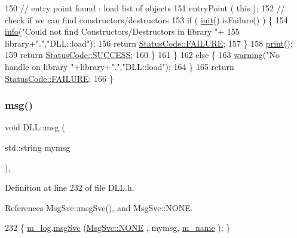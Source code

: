 \begin{DoxyCode}
150       \textcolor{comment}{// entry point found : load list of objects}
151       entryPoint ( \textcolor{keyword}{this} );
152       \textcolor{comment}{// check if we can find constructors/destructors}
153       \textcolor{keywordflow}{if} ( \hyperlink{classDLL_ad2a4ae95995c0fa312ae31169df12d72}{init}().isFailure() ) \{
154     \hyperlink{classDLL_a2b7ea0c85b83a1dec03e4fce13c0d5d2}{info}(\textcolor{stringliteral}{"Could not find Constructors/Destructors in library "}+
155          library+\textcolor{stringliteral}{"."},\textcolor{stringliteral}{"DLL::load"});
156         \textcolor{keywordflow}{return} \hyperlink{classStatusCode_a6f565cbeadc76d14c72f047e5e85eb4ba3da73d4c469762eb9d3c960368252b26}{StatusCode::FAILURE};
157       \}
158       \hyperlink{classDLL_ae45f8b4b291e9da806f4921dd7468cfc}{print}();
159       \textcolor{keywordflow}{return} \hyperlink{classStatusCode_a6f565cbeadc76d14c72f047e5e85eb4badd0da38d3ba0d922efd1f4619bc37ad8}{StatusCode::SUCCESS};
160     \}
161   \}
162   \textcolor{keywordflow}{else} \{
163     \hyperlink{classDLL_a4bbc341bad623eedb5c228c91ce2e858}{warning}(\textcolor{stringliteral}{"No handle on library "}+library+\textcolor{stringliteral}{"."},\textcolor{stringliteral}{"DLL::load"});
164   \}
165   \textcolor{keywordflow}{return} \hyperlink{classStatusCode_a6f565cbeadc76d14c72f047e5e85eb4ba3da73d4c469762eb9d3c960368252b26}{StatusCode::FAILURE};
166 \}
\end{DoxyCode}
\mbox{\label{classDLL_a3a4774ae240e805b9c3ce18b7418d7cc}} 
\subsubsection{\texorpdfstring{msg()}{msg()}\hspace{0.1cm}{\footnotesize\ttfamily [1/2]}}
{\footnotesize\ttfamily void D\+L\+L\+::msg (\begin{DoxyParamCaption}\item[{std\+::string}]{mymsg }\end{DoxyParamCaption})\hspace{0.3cm}{\ttfamily [inline]}, {\ttfamily [private]}}



Definition at line 232 of file D\+L\+L.\+h.



References Msg\+Svc\+::msg\+Svc(), and Msg\+Svc\+::\+N\+O\+NE.


\begin{DoxyCode}
232 \{ \hyperlink{classDLL_a6e66cd993e2d142b48691557ce8e4047}{m\_log}.\hyperlink{classMsgSvc_ad25f18047920cc59a314e5098259711c}{msgSvc} (\hyperlink{classMsgSvc_ae671eb7301996cd049d2da8a65925926a9be9ae32fed8e1e6eba4a58692210fbd}{MsgSvc::NONE}    , mymsg, \hyperlink{classDLL_ad5e4d36d8c2575447f73acc2a703b405}{m\_name} ); \}
\end{DoxyCode}
\mbox{\label{classDLL_a39585579e6dd045ee39cd74ebecc0525}} 
